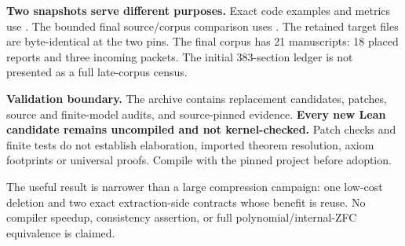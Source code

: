 \textbf{Two snapshots serve different purposes.} Exact code examples and metrics use . The bounded final source/corpus comparison uses . The retained target files are byte-identical at the two pins. The final corpus has 21 manuscripts: 18 placed reports and three incoming packets. The initial 383-section ledger is not presented as a full late-corpus census.

\textbf{Validation boundary.} The archive contains replacement candidates, patches, source and finite-model audits, and source-pinned evidence. \textbf{Every new Lean candidate remains uncompiled and not kernel-checked.} Patch checks and finite tests do not establish elaboration, imported theorem resolution, axiom footprints or universal proofs. Compile with the pinned project before adoption.

The useful result is narrower than a large compression campaign: one low-cost deletion and two exact extraction-side contracts whose benefit is reuse. No compiler speedup, consistency assertion, or full polynomial/internal-ZFC equivalence is claimed.

